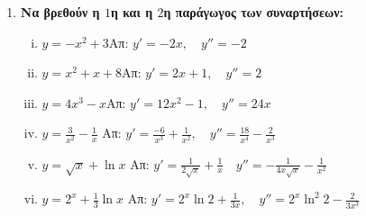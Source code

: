


\everymath{\displaystyle}
\pagestyle{askhseis}



\begin{center}
  \minibox{\bfseries\large \textcolor{Col1}{Ασκήσεις στις Παραγώγους}}
\end{center}

\vspace{\baselineskip}


\begin{enumerate}
  \item {\bfseries Να βρεθούν η $1$η και η $2$η παράγωγος των συναρτήσεων:}
    \begin{enumerate}[i)]
      \item $y=-x^2+3$\hfill Απ: $y'=-2x,\quad y''=-2$
      \item $y=x^2+x+8$\hfill Απ: $y'=2x+1,\quad y''=2$
      \item $y= 4x^3-x$\hfill Απ: $y'=12x^2-1,\quad y''=24x$
      \item $y= \frac{3}{x^{2}} -\frac{1}{x}$
        \hfill Απ: $y'=\frac{-6}{x^3}+\frac{1}{x^2},
        \quad y''= \frac{18}{x^4}-\frac{2}{x^3}$
      \item $ y= \sqrt{ x } + \ln{x} $ 
        \hfill Απ: $ y'= \frac{1}{2 \sqrt{ x }} + \frac{1}{x}\quad y''=
        - \frac{1}{4x \sqrt{ x }}- \frac{1}{x^{2}}  $ 
      \item $ y = 2^{x} + \frac{1}{3} \ln{x} $ 
        \hfill Απ: $ y' = 2^{x}\ln{2} + \frac{1}{3x}, 
        \quad y'' = 2^{x}\ln^{2}2 - \frac{2}{3x^{3}}  $
    \end{enumerate}


\end{enumerate}
